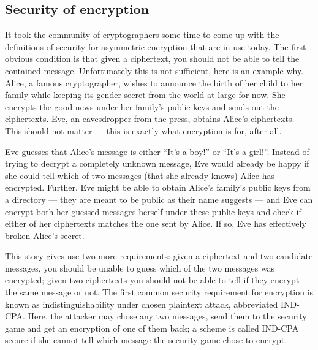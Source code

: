 \documentclass[envcountsame]{llncs}
\begin{document}
\subsection{Security of encryption}

It took the community of cryptographers some time to come up with the
definitions of security for asymmetric encryption that are in use today. The
first obvious condition is that given a ciphertext, you should not be able to
tell the contained message. Unfortunately this is not sufficient, here is an
example why.
Alice, a famous cryptographer, wishes to announce the birth of her child to her family while keeping its gender secret from the world at large for now. She
encrypts the good news under her family's public keys and sends out the 
ciphertexts. Eve, an eavesdropper from the press, obtains Alice's ciphertexts.
This should not matter --- this is exactly what encryption is for, after all.

Eve guesses that Alice's message is either ``It's a boy!'' or ``It's a girl!''.
Instead of trying to decrypt a completely unknown message, Eve would already be
happy if she could tell which of two messages (that she already knows) Alice has
encrypted. Further, Eve might be able to obtain Alice's family's public keys
from a directory --- they are meant to be public as their name suggests --- and
Eve can encrypt both her guessed messages herself under these public keys and
check if either of her ciphertexts matches the one sent by Alice. If so, Eve has
effectively broken Alice's secret.

This story gives use two more requirements: given a ciphertext and two candidate
messages, you should be unable to guess which of the two messages was encrypted;
given two ciphertexts you should not be able to tell if they encrypt the same
message or not. The first common security requirement for encryption is known as
indistinguishability under chosen plaintext attack, abbreviated IND-CPA. Here,
the attacker may chose any two messages, send them to the security game and get
an encryption of one of them back; a scheme is called IND-CPA secure if she
cannot tell which message the security game chose to encrypt.
\end{document}
